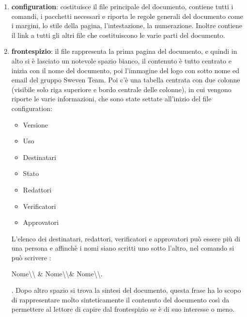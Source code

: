 \begin{enumerate}
    \item \textbf{configuration}:
            costituisce il file principale del documento, contiene tutti i comandi, 
            i pacchetti necessari e riporta le regole generali del documento come 
            i margini, lo stile della pagina, l'intestazione, la numerazione. 
            Inoltre contiene il link a tutti gli altri file che costituiscono le 
            varie parti del documento.

    \item \textbf{frontespizio}:
            il file rappresenta la prima pagina del documento, e quindi in alto si
            è lasciato un notevole spazio bianco, il contenuto è tutto centrato e 
            inizia con il nome del documento, poi l'immagine del logo con sotto 
            nome ed email del gruppo Sweven Team. Poi c'è una tabella centrata 
            con due colonne (visibile solo riga superiore e bordo centrale delle colonne), 
            in cui vengono riporte le varie informazioni, che sono state settate all'inizio 
            del file configuration:
            \begin{itemize}
                \item Versione
                \item Uso
                \item Destinatari
                \item Stato
                \item Redattori
                \item Verificatori
                \item Approvatori
            \end{itemize}
            L'elenco dei destinatari, redattori, verificatori e approvatori 
            può essere più di una persona e affinchè i nomi siano scritti uno sotto 
            l'altro, nel comando si può scrivere : 
            \begin{center}
            	Nome\textbackslash\textbackslash 
            	\& Nome\textbackslash\textbackslash \& Nome\textbackslash\textbackslash.
            \end{center}.
            \newline Dopo altro spazio si trova la sintesi del documento, questa frase
            ha lo scopo di rappresentare molto sinteticamente il contenuto del documento 
            così da permettere al lettore di capire dal frontespizio se è di suo interesse
            o meno.
    

\end{enumerate}
